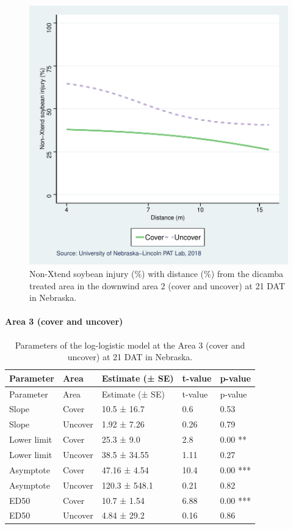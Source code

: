 \documentclass[]{article}
\let\oldparagraph\paragraph
\renewcommand{\paragraph}[1]{\oldparagraph{#1}\mbox{}}
\begin{document}
\begin{figure}
\centering
\includegraphics{Report_files/figure-latex/unnamed-chunk-76-1.pdf}
\caption{Non-Xtend soybean injury (\%) with distance (\%) from the
dicamba treated area in the downwind area 2 (cover and uncover) at 21
DAT in Nebraska.}
\end{figure}

\newpage

\paragraph{Area 3 (cover and uncover)}\label{area-3-cover-and-uncover}

\begin{longtable}[]{@{}lllll@{}}
\caption{Parameters of the log-logistic model at the Area 3 (cover and
uncover) at 21 DAT in Nebraska.}\tabularnewline
\toprule
Parameter & Area & Estimate (± SE) & t-value & p-value\tabularnewline
\midrule
\endfirsthead
\toprule
Parameter & Area & Estimate (± SE) & t-value & p-value\tabularnewline
\midrule
\endhead
Slope & Cover & 10.5 ± 16.7 & 0.6 & 0.53\tabularnewline
Slope & Uncover & 1.92 ± 7.26 & 0.26 & 0.79\tabularnewline
Lower limit & Cover & 25.3 ± 9.0 & 2.8 & 0.00 **\tabularnewline
Lower limit & Uncover & 38.5 ± 34.55 & 1.11 & 0.27\tabularnewline
Asymptote & Cover & 47.16 ± 4.54 & 10.4 & 0.00 ***\tabularnewline
Asymptote & Uncover & 120.3 ± 548.1 & 0.21 & 0.82\tabularnewline
ED50 & Cover & 10.7 ± 1.54 & 6.88 & 0.00 ***\tabularnewline
ED50 & Uncover & 4.84 ± 29.2 & 0.16 & 0.86\tabularnewline
\bottomrule
\end{longtable}
\end{document}
